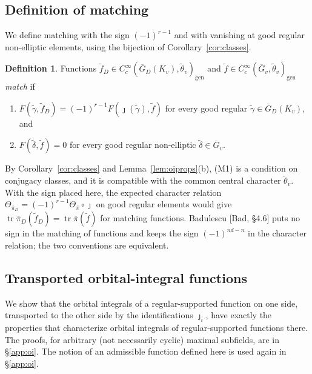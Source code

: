 \documentclass[12pt]{article}
\newcommand{\ov}[1]{\overline{#1}}
\newcommand{\gen}{\mathrm{gen}}
\newcommand{\tr}{\operatorname{tr}}
\newcommand{\Gb}{\ov{G}}
\newcommand{\GDb}{\ov{G}_D}
\newcommand{\pib}{\ov{\pi}}
\newcommand{\jj}{\jmath}
\theoremstyle{plain}
\theoremstyle{definition}
\newtheorem{definition}[theorem]{Definition}
\begin{document}
\subsection{Definition of matching}\label{subsec:defmatch}
We define matching with the sign $(-1)^{r-1}$ and with vanishing at good regular non-elliptic elements, using the bijection of Corollary~\ref{cor:classes}.

\begin{definition}\label{def:matching}
Functions $\tilde f_D\in C_c^\infty(\GDb(K_v),\tilde\theta_v)_\gen$ and $\tilde f\in C_c^\infty(\Gb_v,\tilde\theta_v)_\gen$ \emph{match} if
\begin{enumerate}[label=(M\arabic*)]
\item $F(\tilde\gamma,\tilde f_D)=(-1)^{r-1}F(\jj(\tilde\gamma),\tilde f)$ for every good regular $\tilde\gamma\in\GDb(K_v)$, and
\item $F(\tilde\delta,\tilde f)=0$ for every good regular non-elliptic $\tilde\delta\in\Gb_v$.
\end{enumerate}
\end{definition}

By Corollary~\ref{cor:classes} and Lemma~\ref{lem:oiprops}(b), (M1) is a condition on conjugacy classes, and it is compatible with the common central character $\tilde\theta_v$. With the sign placed here, the expected character relation $\Theta_{\pib_D}=(-1)^{r-1}\Theta_{\pib}\circ\jj$ on good regular elements would give $\tr\pib_D(\tilde f_D)=\tr\pib(\tilde f)$ for matching functions. Badulescu [Bad, \S4.6] puts no sign in the matching of functions and keeps the sign $(-1)^{nd-n}$ in the character relation; the two conventions are equivalent.

\subsection{Transported orbital-integral functions}\label{subsec:transported}
We show that the orbital integrals of a regular-supported function on one side, transported to the other side by the identifications $\jj_i$, have exactly the properties that characterize orbital integrals of regular-supported functions there. The proofs, for arbitrary (not necessarily cyclic) maximal subfields, are in \S\ref{app:oi}. The notion of an admissible function defined here is used again in \S\ref{app:oi}.
\end{document}
